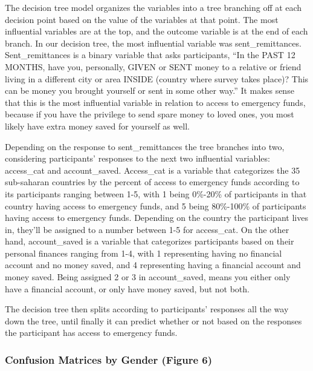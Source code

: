 \documentclass[water,article,submit,moreauthors,pdftex]{mdpi}
\begin{document}
The decision tree model organizes the variables into a tree branching
off at each decision point based on the value of the variables at that
point. The most influential variables are at the top, and the outcome
variable is at the end of each branch. In our decision tree, the most
influential variable was sent\_remittances. Sent\_remittances is a
binary variable that asks participants, ``In the PAST 12 MONTHS, have
you, personally, GIVEN or SENT money to a relative or friend living in a
different city or area INSIDE (country where survey takes place)? This
can be money you brought yourself or sent in some other way.'' It makes
sense that this is the most influential variable in relation to access
to emergency funds, because if you have the privilege to send spare
money to loved ones, you most likely have extra money saved for yourself
as well.

Depending on the response to sent\_remittances the tree branches into
two, considering participants' responses to the next two influential
variables: access\_cat and account\_saved. Access\_cat is a variable
that categorizes the 35 sub-saharan countries by the percent of access
to emergency funds according to its participants ranging between 1-5,
with 1 being 0\%-20\% of participants in that country having access to
emergency funds, and 5 being 80\%-100\% of participants having access to
emergency funds. Depending on the country the participant lives in,
they'll be assigned to a number between 1-5 for access\_cat. On the
other hand, account\_saved is a variable that categorizes participants
based on their personal finances ranging from 1-4, with 1 representing
having no financial account and no money saved, and 4 representing
having a financial account and money saved. Being assigned 2 or 3 in
account\_saved, means you either only have a financial account, or only
have money saved, but not both.

The decision tree then splits according to participants' responses all
the way down the tree, until finally it can predict whether or not based
on the responses the participant has access to emergency funds.

\hypertarget{confusion-matrices-by-gender-figure-6}{%
\subsubsection{Confusion Matrices by Gender (Figure
6)}\label{confusion-matrices-by-gender-figure-6}}
\end{document}
